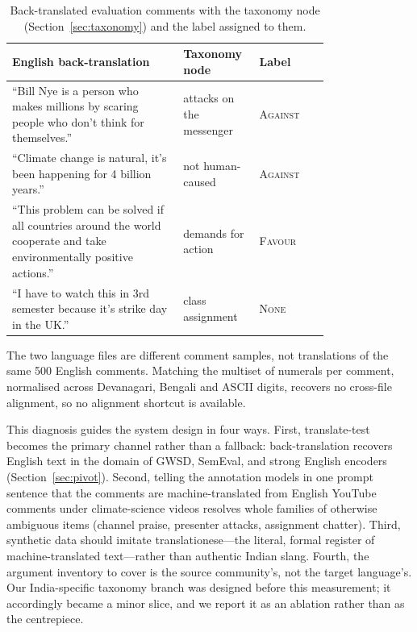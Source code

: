 \documentclass{ceurart}
\begin{document}
\begin{table}[t]
\centering
\caption{Back-translated evaluation comments with the taxonomy node
(Section~\ref{sec:taxonomy}) and the label assigned to them.}
\label{tab:examples}
\begin{tabular}{@{}p{0.54\linewidth}p{0.24\linewidth}l@{}}
\toprule
English back-translation & Taxonomy node & Label \\
\midrule
``Bill Nye is a person who makes millions by scaring people who don't think
for themselves.'' & attacks on the messenger & \textsc{Against} \\
``Climate change is natural, it's been happening for 4 billion years.'' &
not human-caused & \textsc{Against} \\
``This problem can be solved if all countries around the world cooperate and
take environmentally positive actions.'' & demands for action &
\textsc{Favour} \\
``I have to watch this in 3rd semester because it's strike day in the UK.'' &
class assignment & \textsc{None} \\
\bottomrule
\end{tabular}
\end{table}

The two language files are different comment samples, not translations of
the same 500 English comments. Matching the multiset of numerals per
comment, normalised across Devanagari, Bengali and ASCII digits, recovers no
cross-file alignment, so no alignment shortcut is available.

This diagnosis guides the system design in four ways. First, translate-test
becomes the primary channel rather than a fallback: back-translation recovers
English text in the domain of GWSD, SemEval, and strong English encoders
(Section~\ref{sec:pivot}). Second, telling the annotation models in one
prompt sentence that the comments are machine-translated from English
YouTube comments under climate-science videos resolves whole families of
otherwise ambiguous items (channel praise, presenter attacks, assignment
chatter). Third, synthetic data should imitate
translationese---the literal, formal register of machine-translated
text---rather than authentic Indian slang. Fourth, the argument inventory to
cover is the source community's, not the target language's. Our
India-specific taxonomy branch was designed before this measurement; it
accordingly became a minor slice, and we report it as an ablation rather
than as the centrepiece.

\end{document}
